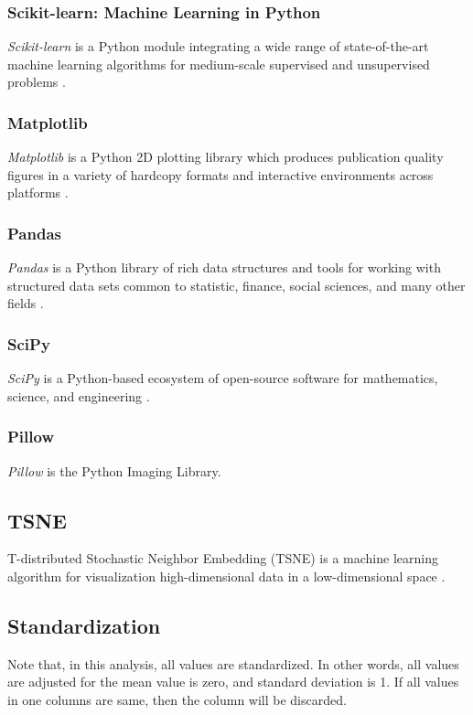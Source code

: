 \documentclass[aps, 10pt, a4paper]{article}
\begin{document}
            \subsubsection{Scikit-learn: Machine Learning in Python}
                \textit{Scikit-learn} is a Python module integrating a wide range of state-of-the-art machine learning algorithms for medium-scale supervised and unsupervised problems \cite{ref:sklearn1}.
                
            \subsubsection{Matplotlib}
                \textit{Matplotlib} is a Python 2D plotting library which produces publication quality figures in a variety of hardcopy formats and interactive environments across platforms \cite{ref:matplotlib1}.
                
            \subsubsection{Pandas}
                \textit{Pandas} is a Python library of rich data structures and tools for working with structured data sets common to statistic, finance, social sciences, and many other fields \cite{ref:pandas1}.
                
            \subsubsection{SciPy}
                \textit{SciPy} is a Python-based ecosystem of open-source software for mathematics, science, and engineering \cite{ref:scipy1}.
                
            \subsubsection{Pillow}
                \textit{Pillow} is the Python Imaging Library. \cite{ref:pil1}
                
        \subsection{TSNE}
            T-distributed Stochastic Neighbor Embedding (TSNE) is a machine learning algorithm for visualization high-dimensional data in a low-dimensional space \cite{ref:tsne1}.
         
        \subsection{Standardization}
            Note that, in this analysis, all values are standardized. In other words, all values are adjusted for the mean value is zero, and standard deviation is 1. If all values in one columns are same, then the column will be discarded. 
    
\end{document}

